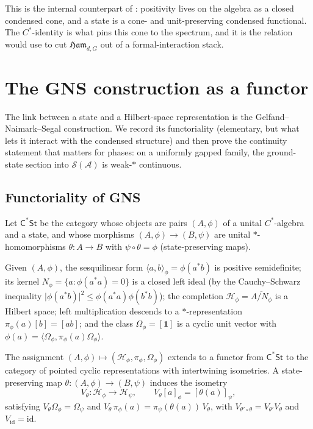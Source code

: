 \documentclass[12pt]{article}
\newcommand{\Ham}{\mathfrak{Ham}}              %
\newcommand{\qla}{\mathcal{A}}                  %
\newcommand{\St}{\mathcal{S}}                   %
\newcommand{\Hil}{\mathcal{H}}                  %
\newcommand{\Rep}{\pi}                          %
\newcommand{\cyc}{\Omega_{\phi}}                %
\newcommand{\CStar}{\mathsf{C^{*}St}}          %
\newcommand{\abs}[1]{\lvert #1 \rvert}
\newcommand{\ip}[2]{\langle #1 , #2 \rangle}
\newcommand{\id}{\mathbf{1}}
\theoremstyle{plain}
\begin{document}
This is the internal counterpart of : positivity lives on the
algebra as a closed condensed cone, and a state is a cone- and unit-preserving
condensed functional. The $C^{*}$-identity is what pins this cone to the spectrum,
and it is the relation  would use to cut $\Ham_{d,G}$ out of a
formal-interaction stack.

\section{The GNS construction as a functor}
\label{sec:gns}

The link between a state and a Hilbert-space representation is the
Gelfand--Naimark--Segal construction. We record its functoriality (elementary, but
what lets it interact with the condensed structure) and then
prove the continuity statement that matters for phases: on a uniformly gapped
family, the ground-state section into $\St(\qla)$ is weak-$\ast$ continuous.

\subsection{Functoriality of GNS}

\begin{definition}
Let $\CStar$ be the category whose objects are pairs $(A,\phi)$ of a unital
$C^{*}$-algebra and a state, and whose morphisms $(A,\phi)\to(B,\psi)$ are unital
$\ast$-homomorphisms $\theta:A\to B$ with $\psi\circ\theta=\phi$ (state-preserving
maps).
\end{definition}

Given $(A,\phi)$, the sesquilinear form $\ip{a}{b}_{\phi}=\phi(a^{*}b)$ is positive
semidefinite; its kernel $N_{\phi}=\{a:\phi(a^{*}a)=0\}$ is a closed left ideal (by
the Cauchy--Schwarz inequality $\abs{\phi(a^{*}b)}^{2}\le\phi(a^{*}a)\phi(b^{*}b)$);
the completion $\Hil_{\phi}=\overline{A/N_{\phi}}$ is a Hilbert space; left
multiplication descends to a $\ast$-representation $\Rep_{\phi}(a)[b]=[ab]$; and the
class $\cyc=[\id]$ is a cyclic unit vector with
$\phi(a)=\ip{\cyc}{\Rep_{\phi}(a)\cyc}$.

\begin{proposition}
\label{prop:gns}
The assignment $(A,\phi)\mapsto(\Hil_{\phi},\Rep_{\phi},\cyc)$ extends to a functor
from $\CStar$ to the category of pointed cyclic representations with intertwining
isometries. A state-preserving map $\theta:(A,\phi)\to(B,\psi)$ induces the isometry
\[
  V_{\theta}:\Hil_{\phi}\to\Hil_{\psi}, \qquad V_{\theta}[a]_{\phi}=[\theta(a)]_{\psi},
\]
satisfying $V_{\theta}\cyc=\Omega_{\psi}$ and
$V_{\theta}\,\Rep_{\phi}(a)=\Rep_{\psi}(\theta(a))\,V_{\theta}$, with
$V_{\theta'\circ\theta}=V_{\theta'}V_{\theta}$ and $V_{\mathrm{id}}=\mathrm{id}$.
\end{proposition}
\end{document}
